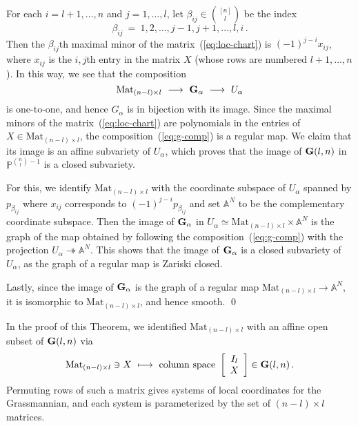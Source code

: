 \documentclass[12pt]{amsart}
\newcommand{\G}{{\bf G}}
\begin{document}
For each $i=l+1,\ldots,n$ and $j=1,\ldots,l$, let 
$\beta_{ij}\in\binom{[n]}{l}$ be the index
$$
  \beta_{ij}\ =\ 1,2,\ldots,j{-}1,j{+}1,\ldots,l,i\,.
$$
Then the $\beta_{ij}$th maximal minor of the matrix~(\ref{eq:loc-chart}) is 
$(-1)^{j-i}x_{ij}$, where $x_{ij}$ is the $i,j$th entry in the matrix $X$
(whose rows are numbered $l+1,\ldots,n$).
In this way, we see that the composition
%
\begin{equation}\label{eq:g-comp}
  \mbox{Mat}_{(n-l)\times l}\ \longrightarrow\ \G_\alpha\ 
  \longrightarrow\ U_\alpha
\end{equation}
%
is one-to-one, and hence $G_\alpha$ is in bijection 
with its image.
Since the maximal minors of the
matrix~(\ref{eq:loc-chart}) are polynomials in the 
entries of $X\in\mbox{Mat}_{(n-l)\times l}$, the
composition~(\ref{eq:g-comp}) is a regular map.
We claim that its image is an affine subvariety of $U_\alpha$, which proves
that the image of $\G(l,n)$ in ${\mathbb P}^{\binom{n}{l}-1}$ is a closed
subvariety. 

For this, we identify $\mbox{Mat}_{(n-l)\times l}$ with the coordinate
subspace of $U_\alpha$ spanned by $p_{\beta_{ij}}$ where $x_{ij}$
corresponds to  $(-1)^{j-i}p_{\beta_{ij}}$ and set 
${\mathbb A}^N$ to be the complementary coordinate subspace.
Then the image of $\G_\alpha$ in 
$U_\alpha\simeq\mbox{Mat}_{(n-l)\times l}\times{\mathbb A}^N$ is the graph
of the map obtained by following the composition~(\ref{eq:g-comp}) with the 
projection $U_\alpha\twoheadrightarrow {\mathbb A}^N$.
This shows that the image of $\G_\alpha$ is a closed subvariety of
$U_\alpha$, 
as the graph of a regular map is Zariski 
closed.

Lastly, since the image of $\G_\alpha$ is the graph of a regular map
$\mbox{Mat}_{(n-l)\times l}\to{\mathbb A}^N\!$, it is isomorphic
to $\mbox{Mat}_{(n-l)\times l}$, and hence smooth.
\qed\medskip

In the proof of this Theorem, we identified 
$\mbox{Mat}_{(n-l)\times l}$
with an affine open subset of $\G(l,n)$ via
%
\begin{equation}\label{eq:loc-coords}
   \mbox{Mat}_{(n-l)\times l} \ni X\ \longmapsto\ 
    \mbox{column space } \left[\begin{array}{c}I_l\\
           X\end{array}\right] \in \G(l,n)\,.
\end{equation}
%
Permuting rows of such a matrix gives systems of local coordinates for the
Grassmannian, and each system is parameterized by the set 
of $(n-l)\times l$ matrices.
\end{document}
